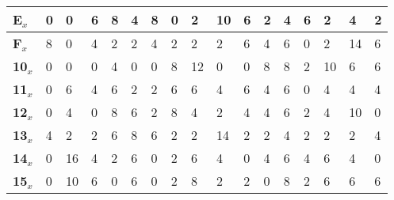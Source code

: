\begin{longtable}[c]{|l|l|l|l|l|l|l|l|l|l|l|l|l|l|l|l|l|}
\textbf{E$_x$}  & 0              & 0              & 6              & 8              & 4              & 8              & 0              & 2              & 10             & 6              & 2              & 4              & 6              & 2              & 4              & 2              \\ \hline
\textbf{F$_x$}  & 8              & 0              & 4              & 2              & 2              & 4              & 2              & 2              & 2              & 6              & 4              & 6              & 0              & 2              & 14             & 6              \\ \hline
\textbf{10$_x$} & 0              & 0              & 0              & 4              & 0              & 0              & 8              & 12             & 0              & 0              & 8              & 8              & 2              & 10             & 6              & 6              \\ \hline
\textbf{11$_x$} & 0              & 6              & 4              & 6              & 2              & 2              & 6              & 6              & 4              & 6              & 4              & 6              & 0              & 4              & 4              & 4              \\ \hline
\textbf{12$_x$} & 0              & 4              & 0              & 8              & 6              & 2              & 8              & 4              & 2              & 4              & 4              & 6              & 2              & 4              & 10             & 0              \\ \hline
\textbf{13$_x$} & 4              & 2              & 2              & 6              & 8              & 6              & 2              & 2              & 14             & 2              & 2              & 4              & 2              & 2              & 2              & 4              \\ \hline
\textbf{14$_x$} & 0              & 16             & 4              & 2              & 6              & 0              & 2              & 6              & 4              & 0              & 4              & 6              & 4              & 6              & 4              & 0              \\ \hline
\textbf{15$_x$} & 0              & 10             & 6              & 0              & 6              & 0              & 2              & 8              & 2              & 2              & 0              & 8              & 2              & 6              & 6              & 6              \\ \hline

\end{longtable}

